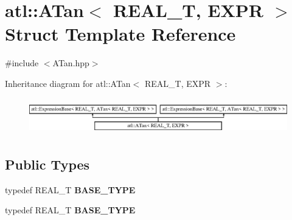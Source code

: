 \hypertarget{structatl_1_1_a_tan}{\section{atl\+:\+:A\+Tan$<$ R\+E\+A\+L\+\_\+\+T, E\+X\+P\+R $>$ Struct Template Reference}
\label{structatl_1_1_a_tan}
}


{\ttfamily \#include $<$A\+Tan.\+hpp$>$}

Inheritance diagram for atl\+:\+:A\+Tan$<$ R\+E\+A\+L\+\_\+\+T, E\+X\+P\+R $>$\+:\begin{figure}[H]
\begin{center}
\leavevmode
\includegraphics[height=1.600000cm]{structatl_1_1_a_tan}
\end{center}
\end{figure}
\subsection*{Public Types}
\begin{DoxyCompactItemize}
\item 
\hypertarget{structatl_1_1_a_tan_a28cc9b6f430e8999562bfa823a902914}{typedef R\+E\+A\+L\+\_\+\+T {\bfseries B\+A\+S\+E\+\_\+\+T\+Y\+P\+E}}\label{structatl_1_1_a_tan_a28cc9b6f430e8999562bfa823a902914}

\item 
\hypertarget{structatl_1_1_a_tan_a28cc9b6f430e8999562bfa823a902914}{typedef R\+E\+A\+L\+\_\+\+T {\bfseries B\+A\+S\+E\+\_\+\+T\+Y\+P\+E}}\label{structatl_1_1_a_tan_a28cc9b6f430e8999562bfa823a902914}

\end{DoxyCompactItemize}
